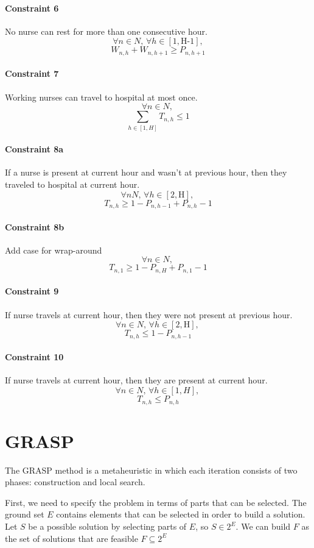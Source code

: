 \documentclass[12pt,a4paper]{article}
\begin{document}
\paragraph{Constraint 6} No nurse can rest for more than one consecutive hour.
$$ \forall n \in N,\, \forall h \in [1, \textrm{H-1}],$$
$$W_{n, h} + W_{n, h+1} \ge P_{n,h+1} $$
%
\paragraph{Constraint 7} Working nurses can travel to hospital at most once.
$$ \forall n \in N,\,$$
$$ \sum_{h \in [1, H]} T_{n,h} \le 1 $$
%
\paragraph{Constraint 8a} If a nurse is present at current hour and wasn't at
previous hour, then they traveled to hospital at current hour.
$$ \forall n N, \,\forall h \in [2, \textrm{H}],\,$$
$$ T_{n,h} \ge 1 - P_{n, h-1} + P_{n, h} - 1 $$
%
\paragraph{Constraint 8b} Add case for wrap-around
$$ \forall n \in N,\,$$
$$ T_{n, 1} \ge 1 - P_{n, H} + P_{n, 1} - 1 $$
%
\paragraph{Constraint 9} If nurse travels at current hour, then they were not
present at previous hour.
$$ \forall n \in N,\,\forall h \in [2, \textrm{H}],\,$$
$$ T_{n,h} \le 1 - P_{n, h-1} $$
%
\paragraph{Constraint 10} If nurse travels at current hour, then they are
present at current hour.
$$ \forall n \in N,\,\forall h \in [1, H],\,$$
$$ T_{n,h} \le P_{n, h} $$
%
%
\section{GRASP}
%
The GRASP method is a metaheuristic in which each iteration consists of two
phases: construction and local search.

First, we need to specify the problem in terms of parts that can be selected.  
The ground set $E$ contains elements that can be selected in order to build a 
solution. Let $S$ be a possible solution by selecting parts of $E$, so $S \in 
2^E$. We can build $F$ as the set of solutions that are feasible $F \subseteq 
2^E$
\end{document}
